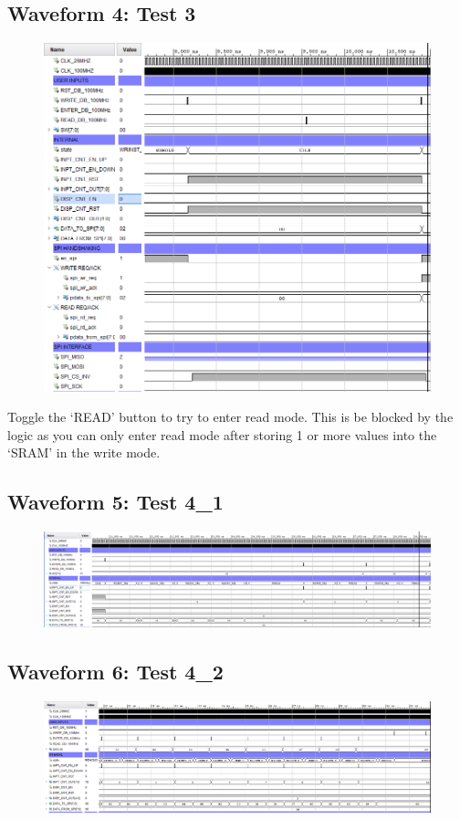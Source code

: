 \documentclass[11pt]{report}
\begin{document}
\subsection*{Waveform 4: Test 3}
\begin{figure}[H]
    \includegraphics[width=\columnwidth]{Reports/Proj/Task3/Assets/Test3.PNG}
\end{figure}

Toggle the `READ' button to try to enter read mode. This is be blocked by the logic as you can only enter read mode after storing 1 or more values into the `SRAM' in the write mode.

\subsection*{Waveform 5: Test 4\_1}
\begin{figure}[H]
    \includegraphics[width=\columnwidth]{Reports/Proj/Task3/Assets/Test4_1.PNG}
\end{figure}

\subsection*{Waveform 6: Test 4\_2}
\begin{figure}[H]
    \includegraphics[width=\columnwidth]{Reports/Proj/Task3/Assets/Test4_2.PNG}
\end{figure}
\end{document}

